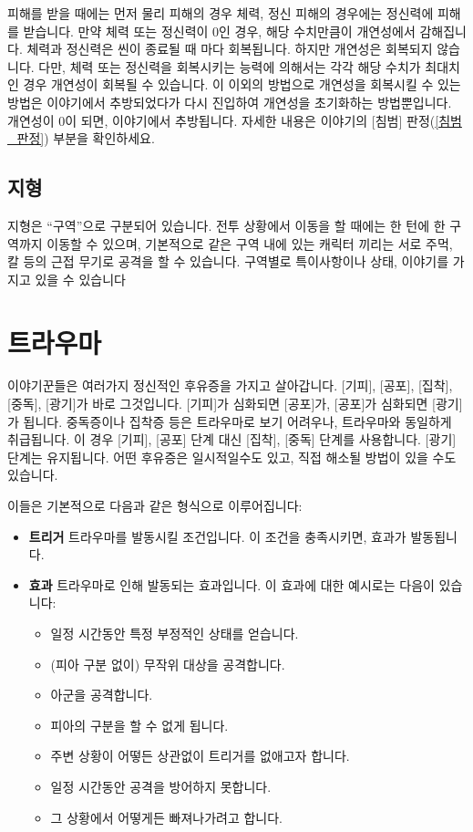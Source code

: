 \documentclass[12pt]{report}
\begin{document}
	피해를 받을 때에는 먼저 물리 피해의 경우 체력, 정신 피해의 경우에는 정신력에 피해를 받습니다. 만약 체력 또는 정신력이 0인 경우, 해당 수치만큼이 개연성에서 감해집니다.
	체력과 정신력은 씬이 종료될 때 마다 회복됩니다. 하지만 개연성은 회복되지 않습니다. 다만, 체력 또는 정신력을 회복시키는 능력에 의해서는 각각 해당 수치가 최대치인 경우 개연성이 회복될 수 있습니다. 이 이외의 방법으로 개연성을 회복시킬 수 있는 방법은 이야기에서 추방되었다가 다시 진입하여 개연성을 초기화하는 방법뿐입니다.
	개연성이 0이 되면, 이야기에서 추방됩니다. 자세한 내용은 이야기의 [침범] 판정(\ref{침범_판정}) 부분을 확인하세요.
	
	\section*{지형}
	지형은 “구역”으로 구분되어 있습니다. 전투 상황에서 이동을 할 때에는 한 턴에 한 구역까지 이동할 수 있으며, 기본적으로 같은 구역 내에 있는 캐릭터 끼리는 서로 주먹, 칼 등의 근접 무기로 공격을 할 수 있습니다. 구역별로 특이사항이나 상태, 이야기를 가지고 있을 수 있습니다
	
	
	\chapter{트라우마}\label{트라우마}
	이야기꾼들은 여러가지 정신적인 후유증을 가지고 살아갑니다. [기피], [공포], [집착], [중독], [광기]가 바로 그것입니다. [기피]가 심화되면 [공포]가, [공포]가 심화되면 [광기]가 됩니다. 중독증이나 집착증 등은 트라우마로 보기 어려우나, 트라우마와 동일하게 취급됩니다. 이 경우 [기피], [공포] 단계 대신 [집착], [중독] 단계를 사용합니다. [광기] 단계는 유지됩니다. 어떤 후유증은 일시적일수도 있고, 직접 해소될 방법이 있을 수도 있습니다.
	
	이들은 기본적으로 다음과 같은 형식으로 이루어집니다:
	
	\begin{itemize}
	\item \textbf{트리거}
		\subitem 트라우마를 발동시킬 조건입니다. 이 조건을 충족시키면, 효과가 발동됩니다.
	
	\item \textbf{효과}
		\subitem 트라우마로 인해 발동되는 효과입니다. 이 효과에 대한 예시로는 다음이 있습니다:
		\begin{itemize}
			\item 일정 시간동안 특정 부정적인 상태를 얻습니다.
			\item (피아 구분 없이) 무작위 대상을 공격합니다.
			\item 아군을 공격합니다.
			\item 피아의 구분을 할 수 없게 됩니다.
			\item 주변 상황이 어떻든 상관없이 트리거를 없애고자 합니다.
			\item 일정 시간동안 공격을 방어하지 못합니다.
			\item 그 상황에서 어떻게든 빠져나가려고 합니다.
		\end{itemize}
	\end{itemize}
	
\end{document}
